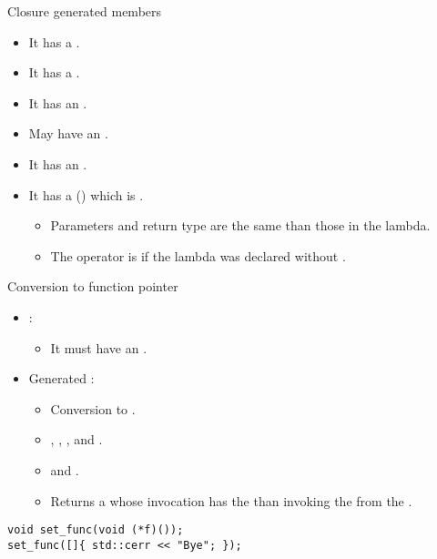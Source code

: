 \begin{frame}[t]{Closure generated members}
  \begin{itemize}
    \item It has a  . 
    \item It has a  .
    \item It has an  .
    \item May have an  .
    \item It has an  .
    \item It has a  
          () which is .
      \begin{itemize}
        \item Parameters and return type are the same than those in the lambda.
        \item The operator is  if the lambda was declared without .
      \end{itemize}
  \end{itemize}
\end{frame}

\begin{frame}[t,fragile]{Conversion to function pointer}
  \begin{itemize}
    \item {}:
      \begin{itemize}
        \item It must have an .
      \end{itemize}
    \item Generated :
      \begin{itemize}
        \item Conversion to .
        \item {} , , 
              , and .
        \item {}  and .
        \item Returns a  whose invocation has the
               than invoking the
               from the .
      \end{itemize}
  \end{itemize}
\begin{lstlisting}
void set_func(void (*f)());
set_func([]{ std::cerr << "Bye"; });
\end{lstlisting}
\end{frame}

